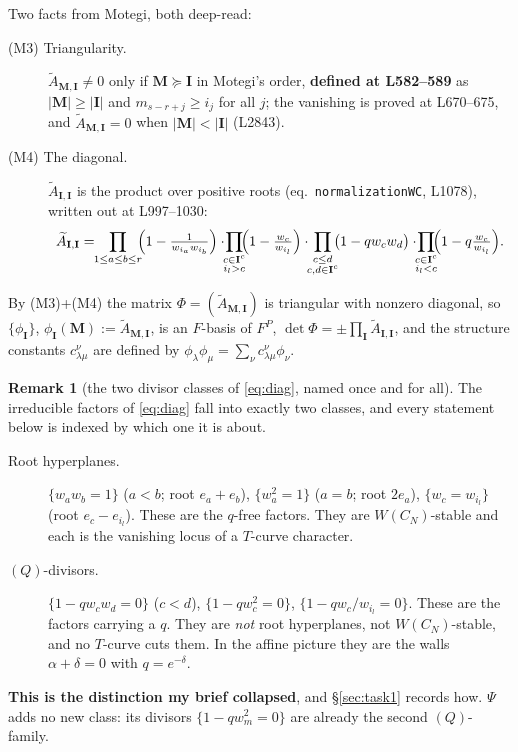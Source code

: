 \documentclass[11pt]{article}
\theoremstyle{definition}
\newtheorem{rem}[thm]{Remark}
\newcommand{\At}{\widetilde{A}}
\newcommand{\bM}{\mathbf{M}}
\newcommand{\bI}{\mathbf{I}}
\begin{document}
Two facts from Motegi, both deep-read:
\begin{description}
\item[(M3) Triangularity.] $\At_{\bM,\bI}\neq0$ only if $\bM\succeq\bI$ in
  Motegi's order, \textbf{defined at L582--589} as $|\bM|\ge|\bI|$ and
  $m_{s-r+j}\ge i_j$ for all $j$; the vanishing is proved at L670--675, and
  $\At_{\bM,\bI}=0$ when $|\bM|<|\bI|$ (L2843).
\item[(M4) The diagonal.] $\At_{\bI,\bI}$ is the product over positive roots
  (eq.\ \texttt{normalizationWC}, L1078), written out at L997--1030:
  \begin{equation}\label{eq:diag}
  \At_{\bI,\bI}
  =\!\!\prod_{1\le a\le b\le r}\!\!\Bigl(1-\tfrac{1}{w_{i_a}w_{i_b}}\Bigr)
   \cdot\!\!\prod_{\substack{c\in\bI^{c}\\ i_l>c}}\!\!\Bigl(1-\tfrac{w_c}{w_{i_l}}\Bigr)
   \cdot\!\!\prod_{\substack{c\le d\\ c,d\in\bI^{c}}}\!\!\bigl(1-qw_cw_d\bigr)
   \cdot\!\!\prod_{\substack{c\in\bI^{c}\\ i_l<c}}\!\!\Bigl(1-q\tfrac{w_c}{w_{i_l}}\Bigr).
  \end{equation}
\end{description}
By (M3)+(M4) the matrix $\Phi=(\At_{\bM,\bI})$ is triangular with nonzero
diagonal, so $\{\phi_{\bI}\}$, $\phi_{\bI}(\bM):=\At_{\bM,\bI}$, is an $F$-basis
of $F^{P}$, $\det\Phi=\pm\prod_{\bI}\At_{\bI,\bI}$, and the structure constants
$c^{\nu}_{\lambda\mu}$ are defined by $\phi_\lambda\phi_\mu=\sum_\nu
c^{\nu}_{\lambda\mu}\phi_\nu$.

\begin{rem}[the two divisor classes of \eqref{eq:diag}, named once and for all]
\label{rem:classes}
The irreducible factors of \eqref{eq:diag} fall into exactly two classes, and
every statement below is indexed by which one it is about.
\begin{description}
\item[Root hyperplanes.] $\{w_aw_b=1\}$ ($a<b$; root $e_a+e_b$),
  $\{w_a^{2}=1\}$ ($a=b$; root $2e_a$), $\{w_c=w_{i_l}\}$ (root
  $e_c-e_{i_l}$).  These are the $q$-free factors.  They are
  $W(C_N)$-stable and each is the vanishing locus of a $T$-curve character.
\item[$(Q)$-divisors.] $\{1-qw_cw_d=0\}$ ($c<d$), $\{1-qw_c^{2}=0\}$,
  $\{1-qw_c/w_{i_l}=0\}$.  These are the factors carrying a $q$.  They are
  \emph{not} root hyperplanes, not $W(C_N)$-stable, and no $T$-curve cuts them.
  In the affine picture they are the walls $\alpha+\delta=0$ with $q=e^{-\delta}$.
\end{description}
\textbf{This is the distinction my brief collapsed}, and \S\ref{sec:task1}
records how.  $\Psi$ adds no new class: its divisors $\{1-qw_m^{2}=0\}$ are
already the second $(Q)$-family.
\end{rem}
\end{document}
